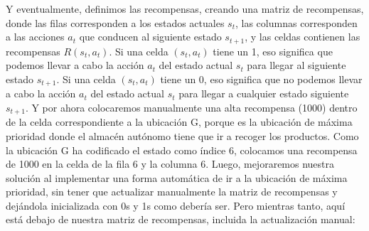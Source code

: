 \documentclass[]{book}
\begin{document}
Y eventualmente, definimos las recompensas, creando una matriz de recompensas, donde las filas corresponden a los estados actuales \(s_t\), las columnas corresponden a las acciones \(a_t\) que conducen al siguiente estado \(s_{t + 1}\), y las celdas contienen las recompensas \(R(s_t, a_t)\). Si una celda \((s_t, a_t)\) tiene un 1, eso significa que podemos llevar a cabo la acción \(a_t\) del estado actual \(s_t\) para llegar al siguiente estado \(s_{t + 1}\). Si una celda \((s_t, a_t)\) tiene un 0, eso significa que no podemos llevar a cabo la acción \(a_t\) del estado actual \(s_t\) para llegar a cualquier estado siguiente \(s_{t + 1}\). Y por ahora colocaremos manualmente una alta recompensa (1000) dentro de la celda correspondiente a la ubicación G, porque es la ubicación de máxima prioridad donde el almacén autónomo tiene que ir a recoger los productos. Como la ubicación G ha codificado el estado como índice 6, colocamos una recompensa de 1000 en la celda de la fila 6 y la columna 6. Luego, mejoraremos nuestra solución al implementar una forma automática de ir a la ubicación de máxima prioridad, sin tener que actualizar manualmente la matriz de recompensas y dejándola inicializada con 0s y 1s como debería ser. Pero mientras tanto, aquí está debajo de nuestra matriz de recompensas, incluida la actualización manual:
\end{document}
